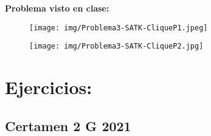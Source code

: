 \documentclass{templateNote}
\begin{document}
\begin{itemize}
    \textbf{Problema visto en clase:}
    \begin{figure}[H]
        \centering
        \texttt{[image: img/Problema3-SATK-CliqueP1.jpeg]}
    \end{figure}
    \begin{figure}[H]
        \centering
        \texttt{[image: img/Problema3-SATK-CliqueP2.jpg]}
    \end{figure}

\end{itemize}

\section{Ejercicios:}
\subsection*{Certamen 2 G 2021}
\end{document}
